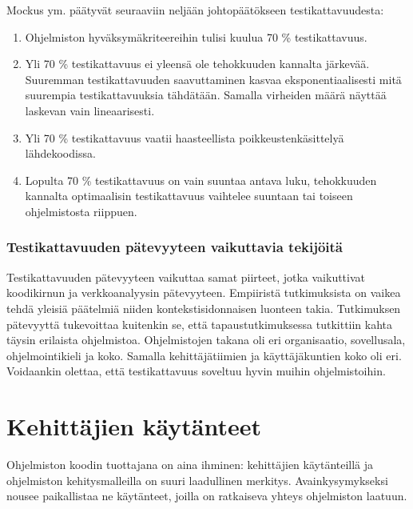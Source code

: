 \documentclass[finnish]{../tktltiki2}
\theoremstyle{definition}
\theoremstyle{remark}
\begin{document}
\noindent Mockus ym. päätyvät seuraaviin neljään johtopäätökseen testikattavuudesta:
    
\begin{enumerate}

    \item Ohjelmiston hyväksymäkriteereihin tulisi kuulua 70 \% testikattavuus.
          
    \item Yli 70 \% testikattavuus ei yleensä ole tehokkuuden kannalta järkevää. Suuremman testikattavuuden 
          saavuttaminen kasvaa eksponentiaalisesti mitä suurempia testikattavuuksia tähdätään. Samalla 
          virheiden määrä näyttää laskevan vain lineaarisesti.
          
    \item Yli 70 \% testikattavuus vaatii haasteellista poikkeustenkäsittelyä lähde\-koodissa.
    
    \item Lopulta 70 \% testikattavuus on vain suuntaa antava luku, tehokkuuden kannalta optimaalisin testikattavuus 
          vaihtelee suuntaan tai toiseen ohjelmistosta riippuen.

\end{enumerate}

\subsubsection{Testikattavuuden pätevyyteen vaikuttavia tekijöitä}

Testikattavuuden pätevyyteen vaikuttaa samat piirteet, jotka vaikuttivat koodikirnun ja verkkoanalyysin pätevyyteen. 
Empiiristä tutkimuksista on vaikea tehdä yleisiä päätelmiä niiden kontekstisidonnaisen luonteen takia. Tutkimuksen 
pätevyyttä tukevoittaa kuitenkin se, että tapaustutkimuksessa tutkittiin kahta täysin erilaista ohjelmistoa. 
Ohjelmistojen takana oli eri organisaatio, sovellusala, ohjelmointikieli ja koko. Samalla kehittäjätiimien ja 
käyttäjäkuntien koko oli eri. Voidaankin olettaa, että testikattavuus soveltuu hyvin muihin ohjelmistoihin.

\section{Kehittäjien käytänteet}

Ohjelmiston koodin tuottajana on aina ihminen: kehittäjien käytänteillä ja ohjelmiston kehitysmalleilla on suuri 
laadullinen merkitys. Avainkysymykseksi nousee paikallistaa ne käytänteet, joilla on ratkaiseva yhteys ohjelmiston 
laatuun.
\end{document}
